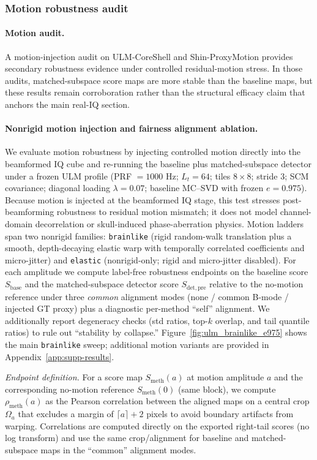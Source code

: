 \documentclass[11pt]{article}
\newif\ifPAPERONLY
\newcommand{\SuppOrApp}[1]{\ifPAPERONLY Supplementary Material\else Appendix~\ref{#1}\fi}
\begin{document}
\subsubsection{Motion robustness audit}
\ifPAPERONLY
\paragraph{Motion audit.}
A motion-injection audit on ULM-CoreShell and Shin-ProxyMotion provides secondary robustness evidence under controlled residual-motion stress. In those audits, matched-subspace score maps are more stable than the baseline maps, but these results remain corroboration rather than the structural efficacy claim that anchors the main real-IQ section.
\else
\paragraph{Nonrigid motion injection and fairness alignment ablation.}
We evaluate motion robustness by injecting controlled motion directly into the beamformed IQ cube and re-running the baseline plus matched-subspace detector under a frozen ULM profile (PRF $=1000$ Hz; $L_t=64$; tiles $8\times 8$; stride 3; SCM covariance; diagonal loading $\lambda=0.07$; baseline MC--SVD with frozen $e=0.975$). Because motion is injected at the beamformed IQ stage, this test stresses post-beamforming robustness to residual motion mismatch; it does not model channel-domain decorrelation or skull-induced phase-aberration physics. Motion ladders span two nonrigid families: \texttt{brainlike} (rigid random-walk translation plus a smooth, depth-decaying elastic warp with temporally correlated coefficients and micro-jitter) and \texttt{elastic} (nonrigid-only; rigid and micro-jitter disabled). For each amplitude we compute label-free robustness endpoints on the baseline score $S_{\mathrm{base}}$ and the matched-subspace detector score $S_{\mathrm{det,pre}}$ relative to the no-motion reference under three \emph{common} alignment modes (none / common B-mode / injected GT proxy) plus a diagnostic per-method ``self'' alignment. We additionally report degeneracy checks (std ratios, top-$k$ overlap, and tail quantile ratios) to rule out ``stability by collapse.'' Figure~\ref{fig:ulm_brainlike_e975} shows the main \texttt{brainlike} sweep; additional motion variants are provided in \SuppOrApp{app:supp-results}.

\emph{Endpoint definition.} For a score map $S_{\mathrm{meth}}(a)$ at motion amplitude $a$ and the corresponding no-motion reference $S_{\mathrm{meth}}(0)$ (same block), we compute $\rho_{\mathrm{meth}}(a)$ as the Pearson correlation between the aligned maps on a central crop $\Omega_a$ that excludes a margin of $\lceil a\rceil+2$ pixels to avoid boundary artifacts from warping. Correlations are computed directly on the exported right-tail scores (no log transform) and use the same crop/alignment for baseline and matched-subspace maps in the ``common'' alignment modes.
\end{document}
